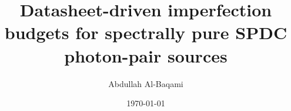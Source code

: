 \documentclass[aps,pra,twocolumn,superscriptaddress,nofootinbib]{revtex4-2}
\begin{document}
\title{Datasheet-driven imperfection budgets for spectrally pure
SPDC photon-pair sources}

\author{Abdullah Al-Baqami}

\date{\today}

\begin{abstract}

\end{abstract}

\maketitle







\end{document}
